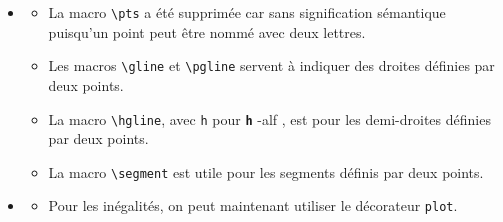 \documentclass[12pt,a4paper]{book}
\makeatletter
\newcommand\env[1]{\texttt{#1}}
\newcommand\macro[1]{\env{\textbackslash{}#1}}
\theoremstyle{definition}
\newcommand\whyprefix[2]{%
	\textbf{\prefix{#1}}-#2%
}
\newcommand\prefix[1]{%
	\texttt{#1}%
}
\newcommand\topic{\@ifstar{\@topic@star}{\@topic@no@star}}
\newcommand\@topic@no@star[1]{%
	\textbf{\textsc{#1}.}%
}
\newcommand\@topic@star[1]{%
	\textbf{\textsc{#1} :}%
}
\makeatother
\begin{document}
{{\begin{description}
\begin{itemize}[itemsep=.5em]
\begin{itemize}[itemsep=.5em]
\begin{itemize}[itemsep=.5em, label=$\rightarrow$]
                \item \macro{sh} et \macro{ash} sont devenus \macro{fsh} et \macro{afsh}.
    
                \item \macro{th} et \macro{ath} sont devenus \macro{fth} et \macro{afth}.
            \end{itemize}
    
    		\item Les macros \macro{acosh}, \macro{asinh} et \macro{atanh} ont été ajoutées.
    
     		\item \macro{derpar} et \macro{derpar*} servent à rédiger des dérivées avec des parenthèses extensibles. En coulisse, \macro{derpow} et \macro{derpow*} sont appelées.
    
            Pour utiliser des parenthèses non extensibles, on passera par \macro{sderpar} et \macro{sderpar*} où \prefix{s} est pour \whyprefix{s}{mall}.
    
    		\item Ajout de \macro{stdint} pour rendre public l'opérateur intégral proposé par défaut par \LaTeX.
        \end{itemize}
    
    
    
    
        \item \topic{Géométrie}
        \begin{itemize}[itemsep=.5em]
            \item La macro \macro{pts} a été supprimée car sans signification sémantique puisqu'un point peut être nommé avec deux lettres.
    
            \item Les macros \macro{gline} et \macro{pgline} servent à indiquer des droites définies par deux points.
    
            \item La macro \macro{hgline}, avec \prefix{h} pour \whyprefix{h}{alf}, est pour les demi-droites définies par deux points.
    
            \item La macro \macro{segment} est utile pour les segments définis par deux points.
        \end{itemize}
    
    
    
    
        \item \topic{Logique}
        \begin{itemize}[itemsep=.5em]
            \item Pour les inégalités, on peut maintenant utiliser le décorateur \verb+plot+.
    

\end{itemize}
\end{itemize}
\end{description}}}
\end{document}
